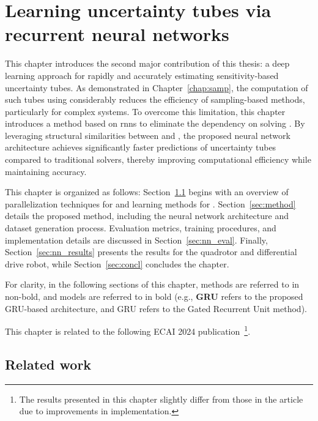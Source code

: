 \chapter{Learning uncertainty tubes via recurrent neural networks} \label{chap:NN}
\localtableofcontents \newpage

This chapter introduces the second major contribution of this thesis: a deep learning approach for rapidly and accurately estimating sensitivity-based uncertainty tubes. 
As demonstrated in Chapter~\ref{chap:samp}, the computation of such tubes using  considerably reduces the efficiency of sampling-based methods, particularly for complex systems.
To overcome this limitation, this chapter introduces a method based on \gls{rnns} to eliminate the dependency on solving .
By leveraging structural similarities between  and , the proposed neural network architecture achieves significantly faster predictions of uncertainty tubes compared to traditional solvers, thereby improving computational efficiency while maintaining accuracy.

This chapter is organized as follows: Section~\ref{sec:learning_overview} begins with an overview of parallelization techniques for  and learning methods for .
Section~\ref{sec:method} details the proposed method, including the neural network architecture and dataset generation process. 
Evaluation metrics, training procedures, and implementation details are discussed in Section~\ref{sec:nn_eval}. 
Finally, Section~\ref{sec:nn_results} presents the results for the quadrotor and differential drive robot, while Section~\ref{sec:concl} concludes the chapter.

For clarity, in the following sections of this chapter, methods are referred to in non-bold, and models are referred to in bold (e.g., \textbf{GRU} refers to the proposed GRU-based architecture, and GRU refers to the Gated Recurrent Unit method).

This chapter is related to the following ECAI 2024 publication~\cite{cECAI}\footnote{The results presented in this chapter slightly differ from those in the article due to improvements in implementation.}.

\section{Related work}\label{sec:learning_overview}

